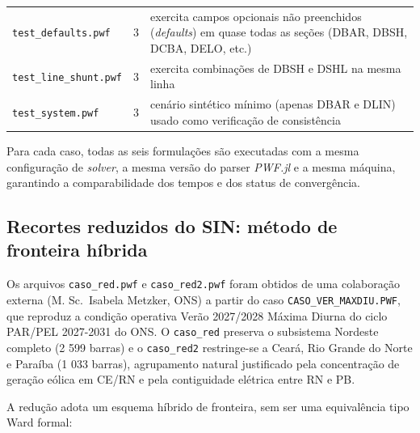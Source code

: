 \begin{table}[!htb]
{\begin{tabular}{p{4.4cm}rp{9.6cm}}
        \midrule
        \texttt{test\_defaults.pwf}      & 3 & exercita campos opcionais não preenchidos (\textit{defaults}) em quase todas as seções (DBAR, DBSH, DCBA, DELO, etc.) \\
        \texttt{test\_line\_shunt.pwf}   & 3 & exercita combinações de DBSH e DSHL na mesma linha \\
        \texttt{test\_system.pwf}        & 3 & cenário sintético mínimo (apenas DBAR e DLIN) usado como verificação de consistência \\
        \bottomrule
    \end{tabular}
}{
}
\end{table}

Para cada caso, todas as seis formulações são executadas com a mesma configuração de \textit{solver}, a mesma versão do parser \textit{PWF.jl} e a mesma máquina, garantindo a comparabilidade dos tempos e dos status de convergência.

\subsection{Recortes reduzidos do SIN: método de fronteira híbrida}
\label{subsec:reducao-fronteira}

Os arquivos \texttt{caso\_red.pwf} e \texttt{caso\_red2.pwf} foram obtidos de uma colaboração externa (M. Sc.\ Isabela Metzker, ONS) a partir do caso \texttt{CASO\_VER\_MAXDIU.PWF}, que reproduz a condição operativa Verão 2027/2028 Máxima Diurna do ciclo PAR/PEL 2027-2031 do ONS. O \texttt{caso\_red} preserva o subsistema Nordeste completo (2 599 barras) e o \texttt{caso\_red2} restringe-se a Ceará, Rio Grande do Norte e Paraíba (1 033 barras), agrupamento natural justificado pela concentração de geração eólica em CE/RN e pela contiguidade elétrica entre RN e PB.

A redução adota um esquema híbrido de fronteira, sem ser uma equivalência tipo Ward formal:

